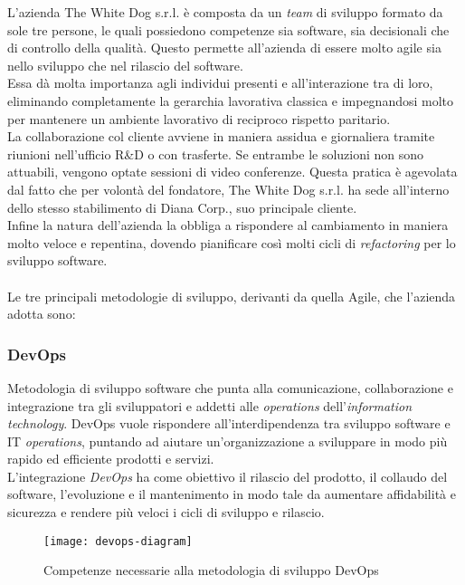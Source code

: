 L'azienda The White Dog s.r.l. è composta da un \textit{team} di sviluppo formato da sole tre persone, le quali possiedono competenze sia software, sia decisionali che di controllo della qualità. Questo permette all'azienda di essere molto agile sia nello sviluppo che nel rilascio del software. \\ 
Essa dà molta importanza agli individui presenti e all'interazione tra di loro, eliminando completamente la gerarchia lavorativa classica e impegnandosi molto per mantenere un ambiente lavorativo di reciproco rispetto paritario. \\
La collaborazione col cliente avviene in maniera assidua e giornaliera tramite riunioni nell'ufficio R\&D o con trasferte. Se entrambe le soluzioni non sono attuabili, vengono optate sessioni di video conferenze. Questa pratica è agevolata dal fatto che per volontà del fondatore, The White Dog s.r.l. ha sede all'interno dello stesso stabilimento di Diana Corp., suo principale cliente. \\
Infine la natura dell'azienda la obbliga a rispondere al cambiamento in maniera molto veloce e repentina, dovendo pianificare così molti cicli di \textit{refactoring} per lo sviluppo software. \\ \\

Le tre principali metodologie di sviluppo, derivanti da quella Agile, che l'azienda adotta sono:

\subsubsection{DevOps}

Metodologia di sviluppo software che punta alla comunicazione, collaborazione e integrazione tra gli sviluppatori e addetti alle \textit{operations} dell'\textit{information technology}. DevOps vuole rispondere all'interdipendenza tra sviluppo software e IT \textit{operations}, puntando ad aiutare un'organizzazione a sviluppare in modo più rapido ed efficiente prodotti e servizi. \\
L'integrazione \textit{DevOps} ha come obiettivo il rilascio del prodotto, il collaudo del software, l'evoluzione e il mantenimento in modo tale da aumentare affidabilità e sicurezza e rendere più veloci i cicli di sviluppo e rilascio. 

\label{DevOps}
\begin{figure}[ht]
	\begin{center}
		\texttt{[image: devops-diagram]}
		\caption{Competenze necessarie alla metodologia di sviluppo DevOps}
	\end{center}
\end{figure}
\FloatBarrier

